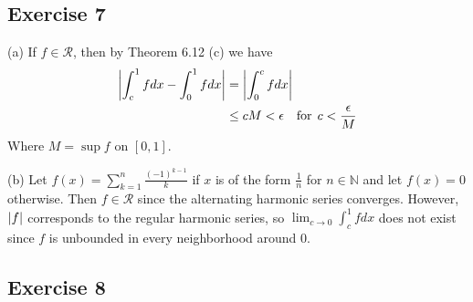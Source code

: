 \subsection{Exercise 7}
(a) If $f \in \mathscr{R}$, then by Theorem 6.12 (c) we have
\begin{align*}
        \abs{\int_{c}^{1} f dx - \int_{0}^{1} f dx} &= \abs{\int_{0}^{c} f dx} \\
                                                    &\leq cM < \epsilon \quad \text{for} \:\:  c < \frac{\epsilon}{M}
\end{align*}
Where $M = \sup{f}$ on $[0, 1]$.

(b) Let $f(x) = \sum_{k=1}^n \frac{(-1)^{k-1}}{k}$ if $x$ is of the form $\frac{1}{n}$ for $n \in \mathbb{N}$ 
and let $f(x) = 0$ otherwise. Then $f \in \mathscr{R}$ since the alternating harmonic series converges.
However, $\abs{f}$ corresponds to the regular harmonic series, so $\lim_{c \to 0} \int_{c}^{1} f dx$ 
does not exist since $f$ is unbounded in every neighborhood around 0.

\subsection{Exercise 8}


